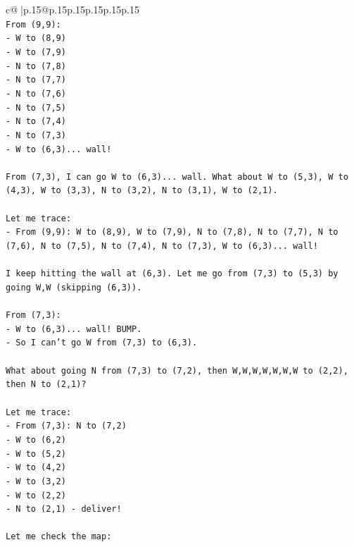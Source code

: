 \documentclass{article}
\begin{document}
{\begin{supertabular}{c@{$\;$}|p{.15\linewidth}@{}p{.15\linewidth}p{.15\linewidth}p{.15\linewidth}p{.15\linewidth}p{.15\linewidth}}
{{{\\ 
\texttt{From (9,9):} \\
\texttt{{-} W to (8,9)} \\
\texttt{{-} W to (7,9)} \\
\texttt{{-} N to (7,8)} \\
\texttt{{-} N to (7,7)} \\
\texttt{{-} N to (7,6)} \\
\texttt{{-} N to (7,5)} \\
\texttt{{-} N to (7,4)} \\
\texttt{{-} N to (7,3)} \\
\texttt{{-} W to (6,3)... wall!} \\
\\ 
\texttt{From (7,3), I can go W to (6,3)... wall. What about W to (5,3), W to (4,3), W to (3,3), N to (3,2), N to (3,1), W to (2,1).} \\
\\ 
\texttt{Let me trace:} \\
\texttt{{-} From (9,9): W to (8,9), W to (7,9), N to (7,8), N to (7,7), N to (7,6), N to (7,5), N to (7,4), N to (7,3), W to (6,3)... wall!} \\
\\ 
\texttt{I keep hitting the wall at (6,3). Let me go from (7,3) to (5,3) by going W,W (skipping (6,3)).} \\
\\ 
\texttt{From (7,3):} \\
\texttt{{-} W to (6,3)... wall! BUMP.} \\
\texttt{{-} So I can't go W from (7,3) to (6,3).} \\
\\ 
\texttt{What about going N from (7,3) to (7,2), then W,W,W,W,W,W,W to (2,2), then N to (2,1)?} \\
\\ 
\texttt{Let me trace:} \\
\texttt{{-} From (7,3): N to (7,2)} \\
\texttt{{-} W to (6,2)} \\
\texttt{{-} W to (5,2)} \\
\texttt{{-} W to (4,2)} \\
\texttt{{-} W to (3,2)} \\
\texttt{{-} W to (2,2)} \\
\texttt{{-} N to (2,1) {-} deliver!} \\
\\ 
\texttt{Let me check the map:} \\
}}}
\end{supertabular}}
\end{document}
